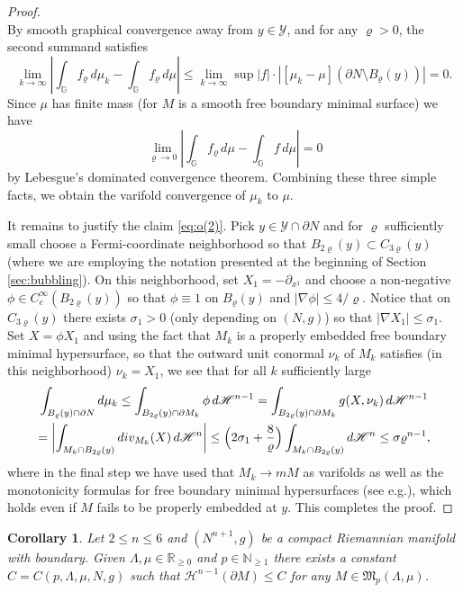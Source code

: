 \documentclass[10pt]{amsart}
\let\mathcal\mathscr
\newtheorem{cor}[thm]{Corollary}
\theoremstyle{definition}
\newcommand{\R}{\mathbb{R}}
\newcommand{\N}{\mathbb{N}}
\newcommand{\h}{\mathscr{H}}
\let\D\nabla
\providecommand{\eg}{e.g.}\providecommand{\ie}{i.e.}\providecommand{\etc}{etc.}\providecommand{\resp}{resp.}\providecommand{\cf}{cf.}
\begin{document}
\begin{proof}
\[\]
By smooth graphical convergence away from $y\in\mathcal{Y}$, and for any $\varrho >0$, the second summand satisfies
\[
\lim_{k\to \infty}\left| \int_{\mathbb{G}} f_\varrho\,d\mu_k -\int_{\mathbb{G}} f_\varrho\,d\mu \right|\leq \lim_{k\to \infty} \sup |f|\cdot |[\mu_k-\mu](\partial N \setminus B_{\varrho}(y))| = 0.
\]
Since $\mu$ has finite mass (for $M$ is a smooth free boundary minimal surface) we have
\[
\lim_{\varrho\to 0}\left| \int_{\mathbb{G}} f_\varrho\,d\mu -\int_{\mathbb{G}} f\,d\mu \right|=0
\]
by Lebesgue's dominated convergence theorem.
Combining these three simple facts, we obtain the varifold convergence of $\mu_k$ to $\mu$.

It remains to justify the claim \eqref{eq:o(2)}. Pick $y\in \mathcal{Y}\cap \partial N$ and for $\varrho$ sufficiently small choose a Fermi-coordinate neighborhood so that $B_{2\varrho} (y) \subset C_{3\varrho} (y)$ (where we are employing the notation presented at the beginning of Section \ref{sec:bubbling}). On this neighborhood, set $X_1 = -\partial_{x^1}$ and choose a non-negative $\phi\in C_c^\infty (B_{2\varrho} (y))$ so that $\phi \equiv 1$ on $B_\varrho (y)$ and $|\D \phi| \leq 4/\varrho$. Notice that on $C_{3\varrho}(y)$ there exists $\sigma_1>0$ (only depending on $(N,g)$) so that $|\D X_1 | \leq \sigma_1$. Set $X= \phi X_1$ and using the fact that $M_k$ is a properly embedded free boundary minimal hypersurface, so that the outward unit conormal $\nu_k$ of $M_k$ satisfies (in this neighborhood) $\nu_k = X_1$, we see that for all $k$ sufficiently large
\begin{multline*}
\int_{B_\varrho (y)\cap \partial N} d \mu_k\leq \int_{B_{2\varrho}(y)\cap \partial M_k} \phi \,d\h^{n-1} = \int_{B_{2\varrho}(y)\cap \partial M_k} g(X, \nu_k)\, d\h^{n-1}\\
= \biggl| \int_{M_k\cap B_{2\varrho}(y)} div_{M_k}(X)\, d\h^n \biggr| \leq \Bigl(2\sigma_1+\frac{8}{\varrho}\Bigr)\int_{M_k\cap B_{2\varrho}(y)} d \h^n \leq \sigma \varrho^{n-1},
\end{multline*}
where in the final step we have used that $M_k\to mM$ as varifolds as well as the monotonicity formulas for free boundary minimal hypersurfaces (see \eg \cite[Cor.\,16]{ACS17}), which holds even if $M$ fails to be properly embedded at $y$. This completes the proof.
\end{proof}

\begin{cor}
\label{cor:boundlength}
Let $2\leq n\leq 6$ and $(N^{n+1},g)$ be a compact Riemannian manifold with boundary. Given $\Lambda, \mu\in \R_{\geq 0}$ and $p\in\N_{\geq 1}$ there exists a constant $C=C(p,\Lambda,\mu, N, g)$ such that $\h^{n-1}(\partial M)\leq C$ for any $M\in \mathfrak{M}_p(\Lambda,\mu)$.
\end{cor}
\end{document}
